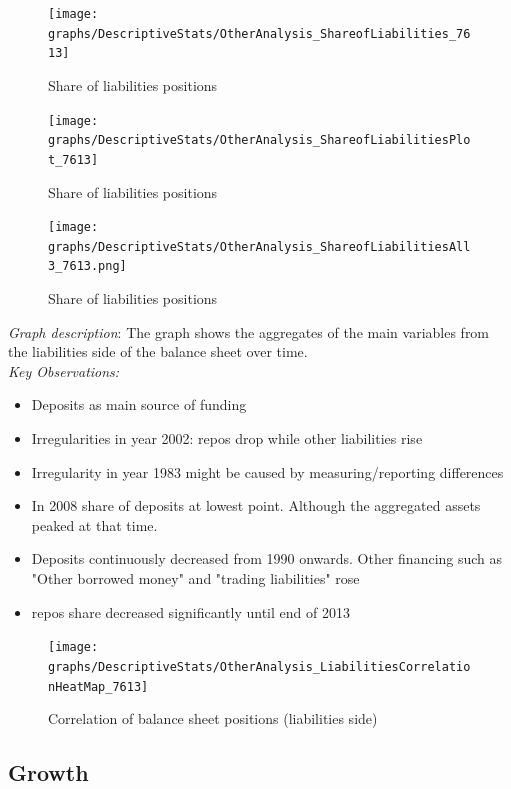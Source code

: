 \documentclass[12pt, a4paper]{article} %
\begin{document}
\begin{figure}[hbtp]
\centering
\caption{Share of liabilities positions}
\texttt{[image: graphs/DescriptiveStats/OtherAnalysis\_ShareofLiabilities\_7613]}
\end{figure}

\newpage

\begin{figure}[hbtp]
\centering
\caption{Share of liabilities positions}
\texttt{[image: graphs/DescriptiveStats/OtherAnalysis\_ShareofLiabilitiesPlot\_7613]}
\end{figure}
\fi

\begin{figure}[hbtp]
\centering
\caption{Share of liabilities positions}
\texttt{[image: graphs/DescriptiveStats/OtherAnalysis\_ShareofLiabilitiesAll3\_7613.png]}
\end{figure}


\noindent \textit{Graph description}: The graph shows the aggregates of the main variables from the liabilities side of the balance sheet over time.\\

\noindent \textit{Key Observations:}
\begin{itemize}
\item Deposits as main source of funding
\item Irregularities in year 2002: repos drop while other liabilities rise
\item Irregularity in year 1983 might be caused by measuring/reporting differences
\item In 2008 share of deposits at lowest point. Although the aggregated assets peaked at that time. 
\item Deposits continuously decreased from 1990 onwards. Other financing such as "Other borrowed money" and "trading liabilities" rose
\item repos share decreased significantly until end of 2013
\end{itemize}



\begin{figure}[hbtp]
\centering
\caption{Correlation of balance sheet positions (liabilities side)}
\texttt{[image: graphs/DescriptiveStats/OtherAnalysis\_LiabilitiesCorrelationHeatMap\_7613]}
\end{figure}

\newpage

\subsection{Growth}
\end{document}

